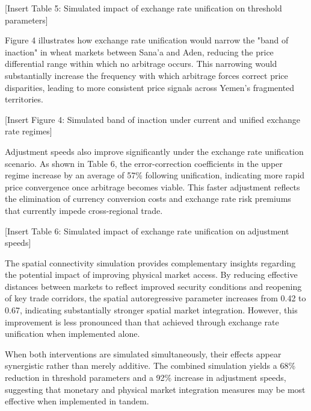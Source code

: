 [Insert Table 5: Simulated impact of exchange rate unification on threshold parameters]

Figure 4 illustrates how exchange rate unification would narrow the "band of inaction" in wheat markets between Sana'a and Aden, reducing the price differential range within which no arbitrage occurs. This narrowing would substantially increase the frequency with which arbitrage forces correct price disparities, leading to more consistent price signals across Yemen's fragmented territories.

[Insert Figure 4: Simulated band of inaction under current and unified exchange rate regimes]

Adjustment speeds also improve significantly under the exchange rate unification scenario. As shown in Table 6, the error-correction coefficients in the upper regime increase by an average of 57\% following unification, indicating more rapid price convergence once arbitrage becomes viable. This faster adjustment reflects the elimination of currency conversion costs and exchange rate risk premiums that currently impede cross-regional trade.

[Insert Table 6: Simulated impact of exchange rate unification on adjustment speeds]

The spatial connectivity simulation provides complementary insights regarding the potential impact of improving physical market access. By reducing effective distances between markets to reflect improved security conditions and reopening of key trade corridors, the spatial autoregressive parameter increases from 0.42 to 0.67, indicating substantially stronger spatial market integration. However, this improvement is less pronounced than that achieved through exchange rate unification when implemented alone.

When both interventions are simulated simultaneously, their effects appear synergistic rather than merely additive. The combined simulation yields a 68\% reduction in threshold parameters and a 92\% increase in adjustment speeds, suggesting that monetary and physical market integration measures may be most effective when implemented in tandem.